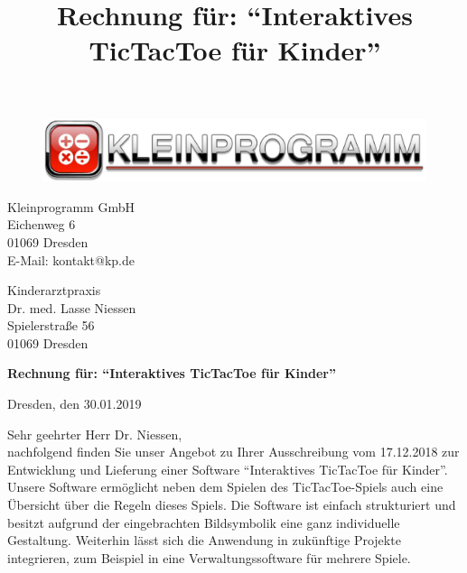 \documentclass[12pt]{article}
\title{Rechnung für: "`Interaktives TicTacToe für Kinder"'}
\begin{document}
\begin{center}
\begin{figure}
\includegraphics[scale=0.9]{banner.pdf}
\end{figure}
\end{center}

\small
\begin{flushright}
Kleinprogramm GmbH\\
Eichenweg 6\\
01069 Dresden\\ 
E-Mail: kontakt@kp.de
\end{flushright}


Kinderarztpraxis\\ Dr. med. Lasse Niessen\\
Spielerstraße 56\\
01069 Dresden\\

\vspace*{10mm}

\large \textbf{Rechnung für: "`Interaktives TicTacToe für Kinder"'}

\normalsize
\begin{flushright}
Dresden, den 30.01.2019\\
\end{flushright}

\vspace*{7mm}

Sehr geehrter Herr Dr. Niessen,\\

nachfolgend finden Sie unser Angebot zu Ihrer Ausschreibung vom 17.12.2018 zur Entwicklung und Lieferung einer Software "`Interaktives TicTacToe für Kinder"'.\\

Unsere Software ermöglicht neben dem Spielen des TicTacToe-Spiels auch eine Übersicht über die Regeln dieses Spiels. Die Software ist einfach strukturiert und besitzt aufgrund der eingebrachten Bildsymbolik eine ganz individuelle Gestaltung. Weiterhin lässt sich die Anwendung in zukünftige Projekte integrieren, zum Beispiel in eine Verwaltungssoftware für mehrere Spiele.
\end{document}
